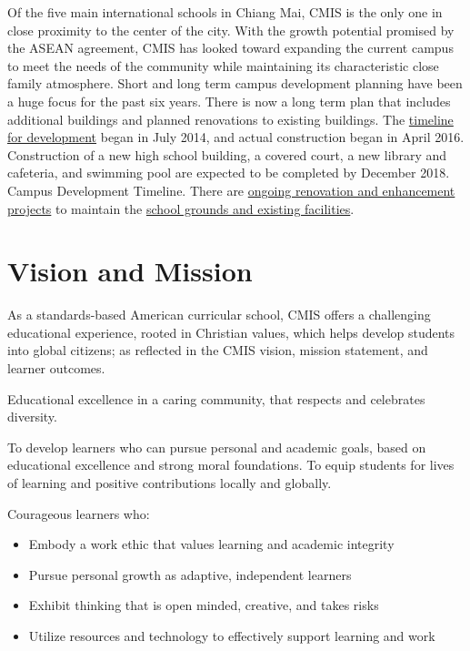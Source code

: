
Of the five main international schools in Chiang Mai, CMIS is the only one in close proximity to the center of the city.  With the growth potential promised by the ASEAN agreement, CMIS has looked toward expanding the current campus to meet the needs of the community while maintaining its characteristic close family atmosphere.  Short and long term campus development planning have been a huge focus for the past six years. There is now a long term plan that includes additional buildings and planned renovations to existing buildings.  The \href{https://docs.google.com/spreadsheets/d/12H8OtZlda_OBTVfUOYvEg0qghC6U9Xz93vGASmJF1hQ/edit#gid=0}{timeline for development} began in July 2014, and actual construction began in April 2016.  Construction of a new high school building, a covered court, a new library and cafeteria, and swimming pool are expected to be completed by December 2018.  Campus Development Timeline.  There are \href{https://docs.google.com/presentation/d/1o_AcPdYb1572Wbm7vk79ssg7RzkQykBGOqrKGVhTArw/edit#slide=id.ga51c5f54b_0_41}{ongoing renovation and enhancement projects} to maintain the \href{https://docs.google.com/presentation/d/1BSJvdHXlQ7o2US1hnvFOyPIcvA3WEPCRc9XYJAqlNt4/edit#slide=id.g540d23d42_034}{school grounds and existing facilities}.

\section{Vision and Mission}

As a standards-based American curricular school, CMIS offers a challenging educational experience, rooted in Christian values, which helps develop students into global citizens; as reflected in the CMIS vision, mission statement, and learner outcomes.

Educational excellence in a caring community, that respects and celebrates diversity.

To develop learners who can pursue personal and academic goals, based on educational excellence and strong moral foundations. To equip students for lives of learning and positive contributions locally and globally.

Courageous learners who:
\begin{itemize}
\item Embody a work ethic that values learning and academic integrity
\item Pursue personal growth as adaptive, independent learners
\item Exhibit thinking that is open minded, creative, and takes risks
\item Utilize resources and technology to effectively support learning and work
\end{itemize}

